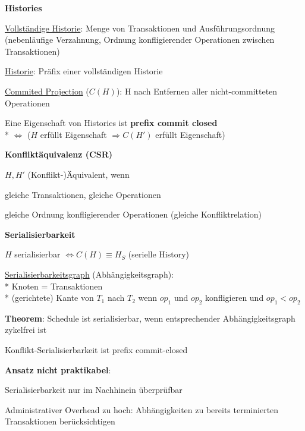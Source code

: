 \textbf{Histories}
\begin{items}
	\item \underline{Vollständige Historie}: Menge von Transaktionen und Ausführungsordnung (nebenläufige Verzahnung, Ordnung konfligierender Operationen zwischen Transaktionen)
	\item \underline{Historie}: Präfix einer vollständigen Historie
	\item \underline{Commited Projection} (\( C(H) \)): H nach Entfernen aller nicht-committeten Operationen
	\item Eine Eigenschaft von Histories ist \textbf{prefix commit closed}
		\\*
		\( \Leftrightarrow \) (\( H \) erfüllt Eigenschaft \( \Rightarrow C(H') \) erfüllt Eigenschaft)
\end{items}

\textbf{Konfliktäquivalenz (CSR)}
\begin{items}
	\item \( H, H' \) (Konflikt-)Äquivalent, wenn
	\begin{enumeration}
		\item gleiche Transaktionen, gleiche Operationen
		\item gleiche Ordnung konfligierender Operationen (gleiche Konfliktrelation)
	\end{enumeration}
\end{items}

\textbf{Serialisierbarkeit}
\begin{items}
	\item \( H \) serialisierbar \( \Leftrightarrow C(H) \equiv H_S \) (serielle History)
	\item \underline{Serialisierbarkeitsgraph} (Abhängigkeitsgraph):
		\\*
		Knoten = Transaktionen
		\\*
		(gerichtete) Kante von $T_1$ nach $T_2$ wenn $op_1$ und $op_2$ konfligieren und $op_1 < op_2$
	\item \textbf{Theorem}: Schedule ist serialisierbar, wenn entsprechender Abhängigkeitsgraph zykelfrei ist
	\item Konflikt-Serialisierbarkeit ist prefix commit-closed
	\item \textbf{Ansatz nicht praktikabel}:
	\begin{enumeration}
		\item Serialisierbarkeit nur im Nachhinein überprüfbar
		\item Administrativer Overhead zu hoch: Abhängigkeiten zu bereits terminierten Transaktionen berücksichtigen
	\end{enumeration}
\end{items}

